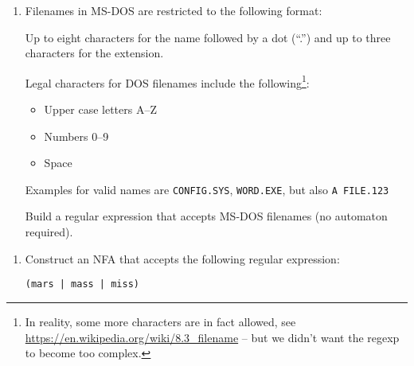 \documentclass[11pt,a4paper]{article}
\begin{document}

  \preamble


  \begin{enumerate}

  \item
  Filenames in MS-DOS are restricted to the following format:

  Up to eight characters for the name followed by a dot (``.'') and up to three characters for the extension.

  Legal characters for DOS filenames include the following\footnote{In reality, some more characters are in fact
  allowed, see \url{https://en.wikipedia.org/wiki/8.3_filename} -- but we didn't want the regexp to become
  too complex.}:

  \begin{itemize}
  \item Upper case letters A–Z
  \item Numbers 0–9
  \item Space
  \end{itemize}

  Examples for valid names are \texttt{CONFIG.SYS}, \texttt{WORD.EXE}, but also \texttt{A FILE.123}

  Build a regular expression that accepts MS-DOS filenames (no automaton required).
  \end{enumerate}


  \begin{enumerate}
  \item
  Construct an NFA that accepts the following regular expression: 

  \begin{center}
  \texttt{(mars | mass | miss)}
  \end{center}

  \end{enumerate}

  \postamble
\end{document}
